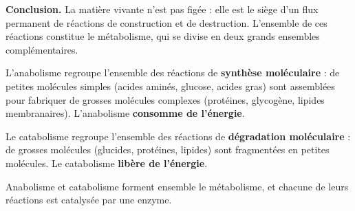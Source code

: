 \documentclass[11pt]{article}
\newcommand{\cle}[1]{{\popxbold\color{popdark}#1}}
\begin{document}
\textbf{Conclusion.} La matière vivante n'est pas figée : elle est le siège d'un flux permanent de réactions de construction et de destruction. L'ensemble de ces réactions constitue le \cle{métabolisme}, qui se divise en deux grands ensembles complémentaires.

\begin{definition}
L'\cle{anabolisme} regroupe l'ensemble des réactions de \textbf{synthèse moléculaire} : de petites molécules simples (acides aminés, glucose, acides gras) sont assemblées pour fabriquer de grosses molécules complexes (protéines, glycogène, lipides membranaires). L'anabolisme \textbf{consomme de l'énergie}.
\par\smallskip
Le \cle{catabolisme} regroupe l'ensemble des réactions de \textbf{dégradation moléculaire} : de grosses molécules (glucides, protéines, lipides) sont fragmentées en petites molécules. Le catabolisme \textbf{libère de l'énergie}.
\par\smallskip
Anabolisme et catabolisme forment ensemble le \cle{métabolisme}, et chacune de leurs réactions est catalysée par une enzyme.
\end{definition}
\end{document}

